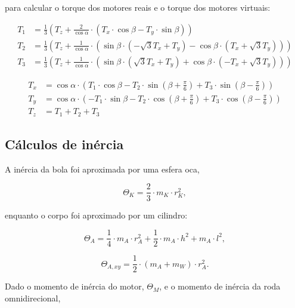 para calcular o torque dos motores reais e o torque dos motores virtuais:

\begin{align*}
T_1 &= \frac{1}{3} \left( T_z + \frac{2}{\cos \alpha} \cdot \left( T_x \cdot \cos \beta - T_y \cdot \sin \beta \right) \right) \\
T_2 &= \frac{1}{3} \left( T_z + \frac{1}{\cos \alpha} \cdot \left( \sin \beta \cdot \left( -\sqrt{3} T_x + T_y \right) - \cos \beta \cdot \left( T_x + \sqrt{3} T_y \right) \right) \right) \\
T_3 &= \frac{1}{3} \left( T_z + \frac{1}{\cos \alpha} \cdot \left( \sin \beta \cdot \left( \sqrt{3} T_x + T_y \right) + \cos \beta \cdot \left( -T_x + \sqrt{3} T_y \right) \right) \right)
\end{align*}

\begin{align*}
T_x &= \cos \alpha \cdot \left( T_1 \cdot \cos \beta - T_2 \cdot \sin \left( \beta + \frac{\pi}{6} \right) + T_3 \cdot \sin \left( \beta - \frac{\pi}{6} \right) \right) \\
T_y &= \cos \alpha \cdot \left( -T_1 \cdot \sin \beta - T_2 \cdot \cos \left( \beta + \frac{\pi}{6} \right) + T_3 \cdot \cos \left( \beta - \frac{\pi}{6} \right) \right) \\
T_z &= T_1 + T_2 + T_3
\end{align*}

\subsection{Cálculos de inércia}

A inércia da bola foi aproximada por uma esfera oca, 

\begin{equation*}
    \Theta_K = \frac{2}{3} \cdot m_K \cdot r_K^2,
\end{equation*}

enquanto o corpo foi aproximado por um cilindro:

\begin{equation*}
    \Theta_A = \frac{1}{4} \cdot m_A \cdot r_A^2 + \frac{1}{2} \cdot m_A \cdot h^2 + m_A \cdot l^2,
\end{equation*}

\begin{equation*}
    \Theta_{A,xy} = \frac{1}{2} \cdot (m_A + m_W) \cdot r_A^2.
\end{equation*}

Dado o momento de inércia do motor, $\Theta_M$, e o momento de inércia da roda omnidirecional,

